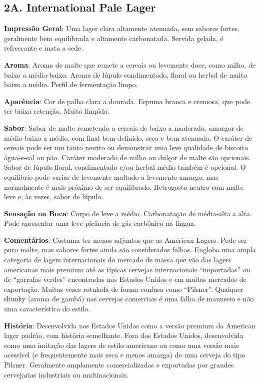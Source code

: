 \subsection*{2A. International Pale Lager}
\textbf{Impressão Geral}: Uma lager clara altamente atenuada, sem sabores fortes, geralmente bem equilibrada e altamente carbonatada. Servida gelada, é refrescante e mata a sede.

\textbf{Aroma}: Aroma de malte que remete a cereais ou levemente doce, como milho, de baixo a médio-baixo. Aroma de lúpulo condimentado, floral ou herbal de muito baixo a médio. Perfil de fermentação limpo.

\textbf{Aparência}: Cor de palha clara a dourada. Espuma branca e cremosa, que pode ter baixa retenção. Muito límpida.

\textbf{Sabor}: Sabor de malte remetendo a cereais de baixo a moderado, amargor de médio-baixo a médio, com final bem definido, seca e bem atenuada. O caráter de cereais pode ser um tanto neutro ou demonstrar uma leve qualidade de biscoito água-e-sal ou pão. Caráter moderado de milho ou dulçor de malte são opcionais. Sabor de lúpulo floral, condimentado e/ou herbal médio também é opcional. O equilíbrio pode variar de levemente maltado a levemente amargo, mas normalmente é mais próximo de ser equilibrado. Retrogosto neutro com malte leve e, às vezes, sabor de lúpulo.

\textbf{Sensação na Boca}: Corpo de leve a médio. Carbonatação de média-alta a alta. Pode apresentar uma leve picância de gás carbônico na língua.

\textbf{Comentários}: Costuma ter menos adjuntos que as American Lagers. Pode ser puro malte, mas sabores fortes ainda são considerados falhas. Engloba uma ampla categoria de lagers internacionais do mercado de massa que vão das lagers americanas mais premium até as típicas cervejas internacionais “importadas” ou de “garrafas verdes” encontradas nos Estados Unidos e em muitos mercados de exportação. Muitas vezes rotulada de forma confusa como “Pilsner”. Qualquer skunky (aroma de gambá) nas cervejas comerciais é uma falha de manuseio e não uma característica do estilo.

\textbf{História}: Desenvolvida nos Estados Unidos como a versão premium da American lager padrão, com história semelhante. Fora dos Estados Unidos, desenvolvida como uma imitação das lagers de estilo americano ou como uma versão mais acessível (e frequentemente mais seca e menos amarga) de uma cerveja do tipo Pilsner. Geralmente amplamente comercializadas e exportadas por grandes cervejarias industriais ou multinacionais.

